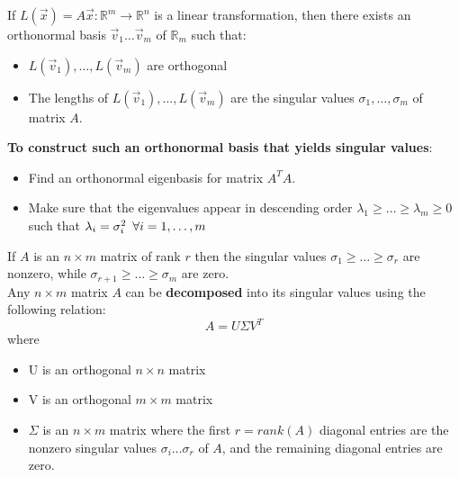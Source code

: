 \documentclass[]{scrartcl}
\begin{document}
	If $L(\vec{x}) = A\vec{x}: \mathbb{R}^m \rightarrow \mathbb{R}^n$ is a linear transformation, then there exists an orthonormal basis $\vec{v}_1 \ldots \vec{v}_m$ of $\mathbb{R}_m$ such that:
	\begin{itemize}
		\item $L(\vec{v}_1), \ldots ,L(\vec{v}_m)$ are orthogonal
		\item The lengths of $L(\vec{v}_1), \ldots ,L(\vec{v}_m)$ are the singular values $\sigma_1, \ldots , \sigma_m$ of matrix $A$.
	\end{itemize}
	
	\textbf{To construct such an orthonormal basis that yields singular values}:
	\begin{itemize}
		\item Find an orthonormal eigenbasis for matrix $A^TA$.
		\item Make sure that the eigenvalues appear in descending order $\lambda_1 \geq \ldots \geq \lambda_m \geq 0$ such that $\lambda_i = \sigma^2_i \enskip \forall i = 1, \ldots, m$
	\end{itemize}

	If $A$ is an $n \times m$ matrix of rank $r$ then the singular values $\sigma_1 \geq \ldots \geq \sigma_r$ are nonzero, while $\sigma_{r+1} \geq \ldots \geq \sigma_m$ are zero.\\
	
	Any $n \times m$ matrix $A$ can be \textbf{decomposed} into its singular values using the following relation:
	$$
	A = U \Sigma V^T
	$$
	where \begin{itemize}
		\item U is an orthogonal $n \times n$ matrix
		\item V is an orthogonal $m \times m$ matrix
		\item $\Sigma$ is an $n \times m$ matrix where the first $r=rank(A)$ diagonal entries are the nonzero singular values $\sigma_i \ldots \sigma_r$ of $A$, and the remaining diagonal entries are zero.
	\end{itemize}
	
\end{document}
